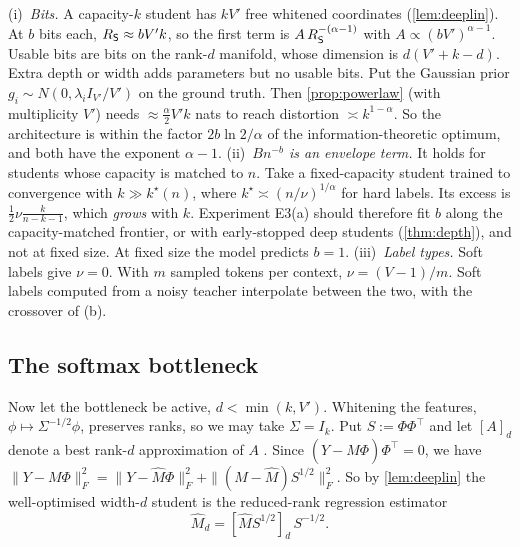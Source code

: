 \begin{remark}\label{rem:law-bits}
(i)~\emph{Bits.} A capacity-$k$ student has $kV'$ free whitened coordinates (\cref{lem:deeplin}). At $b$ bits
each, $R_{\mathsf{S}}\approx bV'k$, so the first term is $A\,R_{\mathsf{S}}^{-(\alpha-1)}$ with $A\propto(bV')^{\alpha-1}$. Usable bits are bits on the
rank-$d$ manifold, whose dimension is $d(V'+k-d)$. Extra depth or width adds parameters but no usable bits.
Put the Gaussian prior $g_i\sim N(0,\lambda_iI_{V'}/V')$ on the ground truth. Then \cref{prop:powerlaw} (with
multiplicity $V'$) needs $\approx\frac\alpha2V'k$ nats to reach distortion $\asymp k^{1-\alpha}$. So the architecture is within the
factor $2b\ln2/\alpha$ of the information-theoretic optimum, and both have the exponent $\alpha-1$.
(ii)~\emph{$Bn^{-b}$ is an envelope term.} It holds for students whose capacity is matched to $n$. Take a
fixed-capacity student trained to convergence with $k\gg k^\star(n)$, where $k^\star\asymp(n/\nu)^{1/\alpha}$ for hard labels.
Its excess is $\frac12\nu\frac k{n-k-1}$, which \emph{grows} with $k$. Experiment E3(a) should therefore fit $b$ along the
capacity-matched frontier, or with early-stopped deep students (\cref{thm:depth}), and not at fixed size. At
fixed size the model predicts $b=1$.
(iii)~\emph{Label types.} Soft labels give $\nu=0$. With $m$ sampled tokens per context, $\nu=(V-1)/m$. Soft
labels computed from a noisy teacher interpolate between the two, with the crossover of (b).
\end{remark}

\subsection{The softmax bottleneck}\label{sec:law-bottleneck}

Now let the bottleneck be active, $d<\min(k,V')$. Whitening the features, $\phi\mapsto\Sigma^{-1/2}\phi$, preserves ranks, so we
may take $\Sigma=I_k$. Put $S:=\Phi\Phi^\top$ and let $[A]_d$ denote a best rank-$d$ approximation of $A$
\citep{eckart1936approximation}. Since $(Y-\hat M\Phi)\Phi^\top=0$, we have
$\|Y-M\Phi\|_F^2=\|Y-\hat M\Phi\|_F^2+\|(M-\hat M)S^{1/2}\|_F^2$. So by \cref{lem:deeplin} the well-optimised width-$d$ student
is the reduced-rank regression estimator \citep{izenman1975reduced}
\[
\hat M_d=[\hat MS^{1/2}]_d\,S^{-1/2}.
\]

